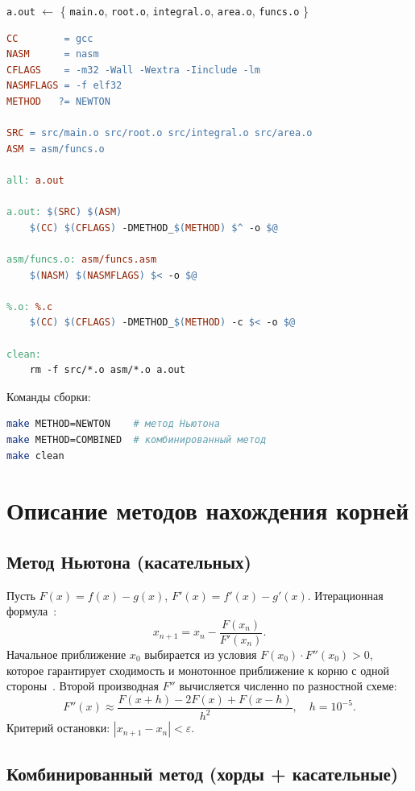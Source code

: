 \documentclass[a4paper,12pt,titlepage,finall]{article}
\begin{document}
\begin{center}
\texttt{a.out} $\leftarrow$ \{
\texttt{main.o}, \texttt{root.o}, \texttt{integral.o},
\texttt{area.o}, \texttt{funcs.o}
\}
\end{center}

\begin{lstlisting}[language=make,basicstyle=\ttfamily\small]
CC        = gcc
NASM      = nasm
CFLAGS    = -m32 -Wall -Wextra -Iinclude -lm
NASMFLAGS = -f elf32
METHOD   ?= NEWTON

SRC = src/main.o src/root.o src/integral.o src/area.o
ASM = asm/funcs.o

all: a.out

a.out: $(SRC) $(ASM)
	$(CC) $(CFLAGS) -DMETHOD_$(METHOD) $^ -o $@

asm/funcs.o: asm/funcs.asm
	$(NASM) $(NASMFLAGS) $< -o $@

%.o: %.c
	$(CC) $(CFLAGS) -DMETHOD_$(METHOD) -c $< -o $@

clean:
	rm -f src/*.o asm/*.o a.out
\end{lstlisting}

Команды сборки:
\begin{lstlisting}[language=bash]
make METHOD=NEWTON    # метод Ньютона
make METHOD=COMBINED  # комбинированный метод
make clean
\end{lstlisting}

\newpage

\section{Описание методов нахождения корней}

\subsection{Метод Ньютона (касательных)}

Пусть $F(x)=f(x)-g(x)$, $F'(x)=f'(x)-g'(x)$.
Итерационная формула~\cite{math}:
\[
    x_{n+1} = x_n - \frac{F(x_n)}{F'(x_n)}.
\]
Начальное приближение $x_0$ выбирается из условия $F(x_0)\cdot F''(x_0)>0$,
которое гарантирует сходимость и монотонное приближение к корню
с одной стороны~\cite{math}.
Второй производная $F''$ вычисляется численно по разностной схеме:
\[
    F''(x)\approx\frac{F(x+h)-2F(x)+F(x-h)}{h^2},\quad h=10^{-5}.
\]
Критерий остановки: $|x_{n+1}-x_n|<\varepsilon$.

\subsection{Комбинированный метод (хорды + касательные)}
\end{document}
